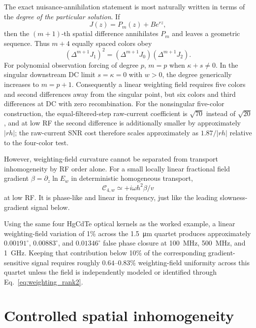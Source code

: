 \documentclass[11pt]{article}
\begin{document}
The exact nuisance-annihilation statement is most naturally written in terms of the \emph{degree of the particular solution}. If
\begin{equation}
J(z)=P_m(z)+Be^{rz},
\end{equation}
then the $(m+1)$-th spatial difference annihilates $P_m$ and leaves a geometric sequence. Thus $m+4$ equally spaced colors obey
\begin{equation}
\boxed{(\Delta^{m+1}J_1)^2=(\Delta^{m+1}J_0)(\Delta^{m+1}J_2).}
\label{eq:poly_annihilation}
\end{equation}
For polynomial observation forcing of degree $p$, $m=p$ when $\kappa+s\neq0$. In the singular downstream DC limit $s=\kappa=0$ with $w>0$, the degree generically increases to $m=p+1$. Consequently a linear weighting field requires five colors and second differences away from the singular point, but six colors and third differences at DC with zero recombination. For the nonsingular five-color construction, the equal-filtered-step raw-current coefficient is $\sqrt{70}$ instead of $\sqrt{20}$, and at low RF the second difference is additionally smaller by approximately $|rh|$; the raw-current SNR cost therefore scales approximately as $1.87/|rh|$ relative to the four-color test.

However, weighting-field curvature cannot be separated from transport inhomogeneity by RF order alone. For a small locally linear fractional field gradient $\beta=\partial_z\ln E_w$ in deterministic homogeneous transport,
\begin{equation}
\boxed{\mathcal C_{4,w}\simeq+i\omega h^2\beta/v}
\label{eq:weighting_lowrf}
\end{equation}
at low RF. It is phase-like and linear in frequency, just like the leading slowness-gradient signal below.

Using the same four HgCdTe optical kernels as the worked example, a linear weighting-field variation of 1\% across the \SI{1.5}{\micro\meter} quartet produces approximately $0.00191^\circ$, $0.00883^\circ$, and $0.01346^\circ$ false phase closure at \SI{100}{MHz}, \SI{500}{MHz}, and \SI{1}{GHz}. Keeping that contribution below 10\% of the corresponding gradient-sensitive signal requires roughly $0.64$--$0.83$\% weighting-field uniformity across this quartet unless the field is independently modeled or identified through Eq.~\eqref{eq:weighting_rank2}.

\section{Controlled spatial inhomogeneity}
\end{document}
